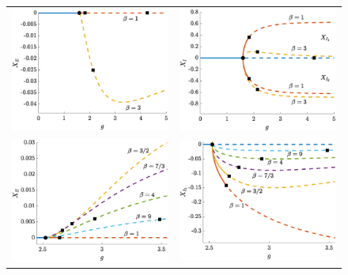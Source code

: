 \documentclass[reqno]{siamonline190516}
\begin{document}
\begin{figure}
    \centering
    \begin{tabular}{cc}
    \includegraphics[width=7.8cm]{images/bdnoclusters20E.eps} &
    \includegraphics[width=7.8cm]{images/bdnoclusters20I.eps} \\
    \includegraphics[width=7.8cm]{images/bdnoclusters50E.eps} &
    \includegraphics[width=7.8cm]{images/bdnoclusters50I.eps}

\end{tabular}
\end{figure}
\end{document}
